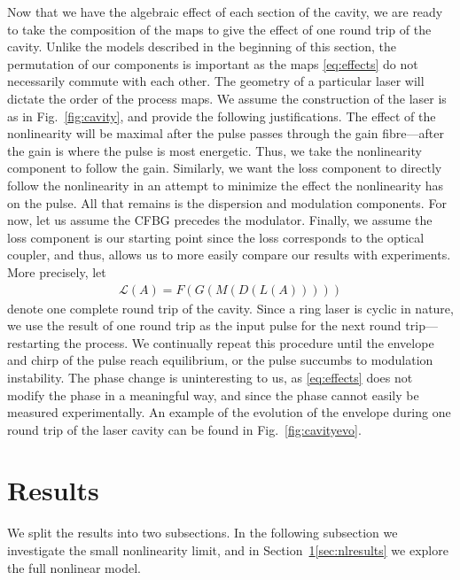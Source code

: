\documentclass[9pt,twocolumn,twoside]{osajnl}
\begin{document}
Now that we have the algebraic effect of each section of the cavity, we are ready to take the composition of the maps to give the effect of one round trip of the cavity. Unlike the models described in the beginning of this section, the permutation of our components is important as the maps \eqref{eq:effects} do not necessarily commute with each other. The geometry of a particular laser will dictate the order of the process maps. We assume the construction of the laser is as in Fig.~\ref{fig:cavity}, and provide the following justifications. The effect of the nonlinearity will be maximal after the pulse passes through the gain fibre---after the gain is where the pulse is most energetic. Thus, we take the nonlinearity component to follow the gain. Similarly, we want the loss component to directly follow the nonlinearity in an attempt to minimize the effect the nonlinearity has on the pulse. All that remains is the dispersion and modulation components. For now, let us assume the CFBG precedes the modulator. Finally, we assume the loss component is our starting point since the loss corresponds to the optical coupler, and thus, allows us to more easily compare our results with experiments. More precisely, let
\begin{align}
	\mathcal{L}(A) = F(G(M(D(L(A)))))
	\label{eq:order}
\end{align}
denote one complete round trip of the cavity. Since a ring laser is cyclic in nature, we use the result of one round trip as the input pulse for the next round trip---restarting the process. We continually repeat this procedure until the envelope and chirp of the pulse reach equilibrium, or the pulse succumbs to modulation instability. The phase change is uninteresting to us, as \eqref{eq:effects} does not modify the phase in a meaningful way, and since the phase cannot easily be measured experimentally. An example of the evolution of the envelope during one round trip of the laser cavity can be found in Fig.~\ref{fig:cavityevo}.

\section{Results}
\label{sec:results}
We split the results into two subsections. In the following subsection we investigate the small nonlinearity limit, and in Section~\ref{sec:results}\ref{sec:nlresults} we explore the full nonlinear model.
\end{document}
